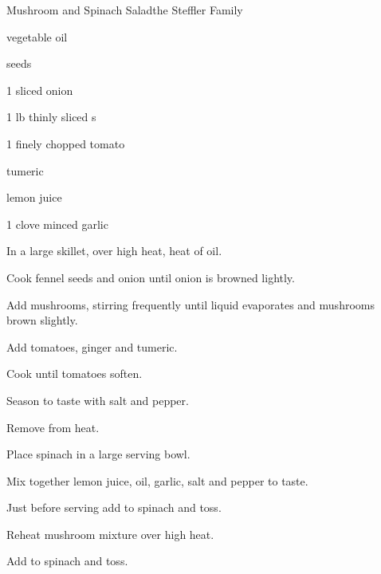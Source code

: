 \begin{recipe}{Mushroom and Spinach Salad}{the Steffler Family}{}

\begin{ingredients}
\item {} vegetable oil
\item {}  seeds
\item 1 sliced onion
\item 1 lb thinly sliced s
\item 1 finely chopped tomato
\item \tp{\half} 
\item \tp{\quarter} tumeric
\item {} lemon juice
\item 1 clove minced garlic
\item {} 
\end{ingredients}

\begin{directions}
\item In a large skillet, over high heat, heat  of oil.
\item Cook fennel seeds and onion until onion is browned lightly.
\item Add mushrooms, stirring frequently until liquid evaporates and mushrooms brown slightly.
\item Add tomatoes, ginger and tumeric.
\item Cook until tomatoes soften.
\item Season to taste with salt and pepper.
\item Remove from heat.
\item Place spinach in a large serving bowl.
\item Mix together lemon juice, oil, garlic, salt and pepper to taste.
\item Just before serving add to spinach and toss.
\item Reheat mushroom mixture over high heat.
\item Add to spinach and toss.
\end{directions}
\end{recipe}
